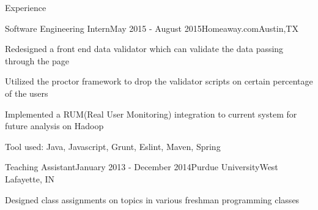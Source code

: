 \documentclass{resume} %
\begin{document}
\begin{rSection}{Experience}

\begin{rSubsection}{Software Engineering Intern}{May 2015 - August 2015}{Homeaway.com}{Austin,TX}
\item Redesigned a front end data validator which can validate the data passing through the page 
\item Utilized the proctor framework to drop the validator scripts on certain percentage of the users 
\item Implemented a RUM(Real User Monitoring) integration to current system for future analysis on Hadoop 
\item Tool used: Java, Javascript, Grunt, Eslint, Maven, Spring

\end{rSubsection}

\begin{rSubsection}{Teaching Assistant}{January 2013 - December 2014}{Purdue University}{West Lafayette, IN}
\item Designed class assignments on topics in various freshman programming classes
\end{rSubsection}


\end{rSection}


\end{document}
